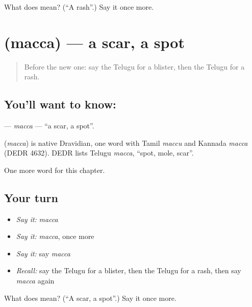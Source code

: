 \begin{tcolorbox}[breakable,colback=teal!4,colframe=teal!35!black,title={Before you move on}]
What does  mean? (\textquotedblleft{}A rash\textquotedblright{}.) Say it once more.
\end{tcolorbox}
\section[\texorpdfstring{\te{మచ్చ} (macca)}{మచ్చ (macca)}]{ (macca) — a scar, a spot}

\label{lesson:TE-C169-macca}



\begin{quote}
Before the new one: say the Telugu for a blister, then the Telugu for a rash.
\end{quote}

\subsection*{You'll want to know: }
\textbf{} — \emph{macca} — \textquotedblleft{}a scar, a spot\textquotedblright{}.

\begin{cousinweb}
\textbf{} (\emph{macca}) is native Dravidian, one word with Tamil \emph{maccu} and Kannada \emph{macca} (DEDR 4632). DEDR lists Telugu \emph{macca}, \textquotedblleft{}spot, mole, scar\textquotedblright{}.
\end{cousinweb}

\begin{grammarlens}[title={What you've built}]
One more word for this chapter.
\end{grammarlens}

\subsection*{Your turn}
\begin{itemize}
\raggedright
  \item \emph{Say it:} \emph{macca}
  \item \emph{Say it:} \emph{macca}, once more
  \item \emph{Say it:} say \emph{macca}
  \item \emph{Recall:} say the Telugu for a blister, then the Telugu for a rash, then say \emph{macca} again
\end{itemize}

\begin{tcolorbox}[breakable,colback=teal!4,colframe=teal!35!black,title={Before you move on}]
What does  mean? (\textquotedblleft{}A scar, a spot\textquotedblright{}.) Say it once more.
\end{tcolorbox}
